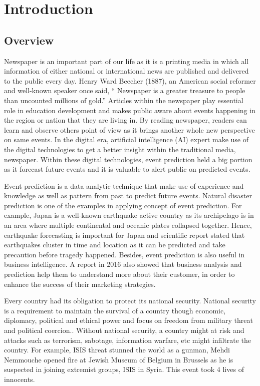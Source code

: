 \documentclass[twosides]{utmthesis}
\let\cite\citep
\begin{document}
\chapter{Introduction}


\section{Overview}

Newspaper is an important part of our life as it is a printing media in which all information of either national or international news are published and delivered to the public every day. Henry Ward Beecher (1887), an American social reformer and well-known speaker once said, “ Newspaper is a greater treasure to people than uncounted millions of gold.” Articles within the newspaper play essential role in education development and makes public aware about events happening in the region or nation that they are living in. By reading newspaper, readers can learn and observe others point of view as it brings another whole new perspective on same events. In the digital era, artificial intelligence (AI) expert make use of the digital technologies to get a better insight within the traditional media, newspaper.\cite{jamesbaker2019} Within these digital technologies, event prediction held a big portion as it forecast future events and it is valuable to alert public on predicted events. 

Event prediction is a data analytic technique that make use of experience and knowledge as well as pattern from past to predict future events. Natural disaster prediction is one of the examples in applying concept of event prediction. For example, Japan is a well-known earthquake active country as its archipelago is in an area where multiple continental and oceanic plates collapsed together. Hence, earthquake forecasting is important for Japan and scientific report \citep{jamesd.goltz2018} stated that earthquakes cluster in time and location as it can be predicted and take precaution before tragedy happened. Besides, event prediction is also useful in business intelligence. A report in 2016 also showed that business analysis and prediction help them to understand more about their customer, in order to enhance the success of their marketing strategies. \citep{erevelles2016big}

Every country had its obligation to protect its national security. National security is a requirement to maintain the survival of a country though economic, diplomacy, political and ethical power and focus on freedom from military threat and political coercion.. Without national security, a country might at risk and attacks such as terrorism, sabotage, information warfare, etc might infiltrate the country. For example, ISIS threat stunned the world as a gunman, Mehdi Nemmouche opened fire at Jewish Museum of Belgium in Brussels as he is suspected in joining extremist groups, ISIS in Syria. This event took 4 lives of innocents.\citep{rafcasert}
\end{document}
